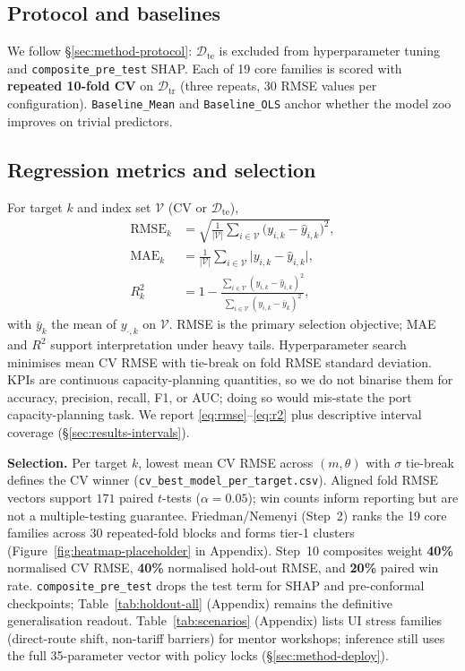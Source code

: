 \documentclass[12pt,twocolumn,a4paper]{article}
\theoremstyle{plain}
\theoremstyle{definition}
\theoremstyle{remark}
\newcommand{\train}{\mathcal{D}_{\mathrm{tr}}}
\newcommand{\test}{\mathcal{D}_{\mathrm{te}}}
\begin{document}
\subsection{Protocol and baselines}
\label{sec:exp-protocol}

We follow \S\ref{sec:method-protocol}: $\test$ is excluded from hyperparameter tuning and \texttt{composite\_pre\_test} SHAP.
Each of 19 core families is scored with \textbf{repeated 10-fold CV} on $\train$ (three repeats, 30 RMSE values per configuration).
\texttt{Baseline\_Mean} and \texttt{Baseline\_OLS} anchor whether the model zoo improves on trivial predictors.

\subsection{Regression metrics and selection}
\label{sec:exp-metrics}

For target $k$ and index set $\mathcal{V}$ (CV or $\test$),
\begin{align}
  \mathrm{RMSE}_k &= \sqrt{\frac{1}{|\mathcal{V}|}\sum_{i\in\mathcal{V}} \bigl(y_{i,k}-\hat{y}_{i,k}\bigr)^2}, \label{eq:rmse}\\
  \mathrm{MAE}_k &= \frac{1}{|\mathcal{V}|}\sum_{i\in\mathcal{V}} \bigl|y_{i,k}-\hat{y}_{i,k}\bigr|, \label{eq:mae}\\
  R^2_k &= 1 - \frac{\sum_{i\in\mathcal{V}}(y_{i,k}-\hat{y}_{i,k})^2}{\sum_{i\in\mathcal{V}}(y_{i,k}-\bar{y}_k)^2}, \label{eq:r2}
\end{align}
with $\bar{y}_k$ the mean of $y_{\cdot,k}$ on $\mathcal{V}$.
RMSE is the primary selection objective; MAE and $R^2$ support interpretation under heavy tails.
Hyperparameter search minimises mean CV RMSE with tie-break on fold RMSE standard deviation.
KPIs are continuous capacity-planning quantities, so we do not binarise them for accuracy, precision, recall, F1, or AUC; doing so would mis-state the port capacity-planning task.
We report \eqref{eq:rmse}--\eqref{eq:r2} plus descriptive interval coverage (\S\ref{sec:results-intervals}).

\textbf{Selection.} Per target $k$, lowest mean CV RMSE across $(m,\theta)$ with $\sigma$ tie-break defines the CV winner (\texttt{cv\_best\_model\_per\_target.csv}).
Aligned fold RMSE vectors support $171$ paired $t$-tests ($\alpha{=}0.05$); win counts inform reporting but are not a multiple-testing guarantee.
Friedman/Nemenyi (Step~2) ranks the 19 core families across 30 repeated-fold blocks and forms tier-1 clusters (Figure~\ref{fig:heatmap-placeholder} in Appendix).
Step~10 composites weight \textbf{40\%} normalised CV RMSE, \textbf{40\%} normalised hold-out RMSE, and \textbf{20\%} paired win rate.
\texttt{composite\_pre\_test} drops the test term for SHAP and pre-conformal checkpoints; Table~\ref{tab:holdout-all} (Appendix) remains the definitive generalisation readout.
Table~\ref{tab:scenarios} (Appendix) lists UI stress families (direct-route shift, non-tariff barriers) for mentor workshops; inference still uses the full 35-parameter vector with policy locks (\S\ref{sec:method-deploy}).
\end{document}
